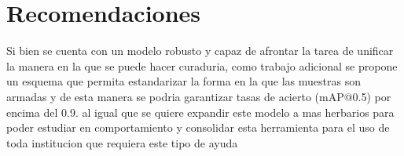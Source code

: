 \chapter{Recomendaciones}

Si bien se cuenta con un modelo robusto y capaz de afrontar la tarea de unificar la manera en la que se puede hacer curaduria, como trabajo adicional se propone un esquema que permita estandarizar la forma en la que las muestras son armadas y de esta manera se podria garantizar tasas de acierto (mAP@0.5) por encima del 0.9. al igual que se quiere expandir este modelo a mas herbarios para poder estudiar en comportamiento y consolidar esta herramienta para el uso de toda institucion que requiera este tipo de ayuda 